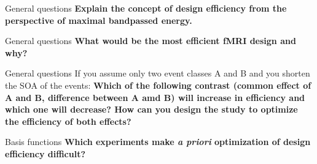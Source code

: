 \documentclass{beamer}
\begin{document}
\begin{frame}{General questions}
  \textbf{Explain the concept of design efficiency from the perspective of maximal bandpassed energy.}

\end{frame}


\begin{frame}{General questions}
  \textbf{What would be the most efficient fMRI design and why?} \rightarrow

% 
\end{frame}


\begin{frame}{General questions}
  If you assume only two event classes A and B and you shorten the SOA of the events: \textbf{Which of the following contrast (common effect of A and B, difference between A amd B) will increase in efficiency and which one will decrease? How can you design the study to optimize the efficiency of both effects?}

\end{frame}


\begin{frame}{Basis functions}
  \textbf{Which experiments make \textit{a priori} optimization of design efficiency difficult?}

\end{frame}
\end{document}
